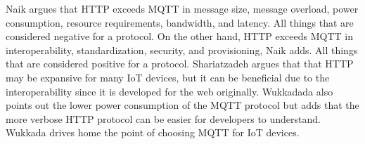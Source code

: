 Naik argues that HTTP exceeds MQTT in message size, message overload, power consumption, resource requirements, bandwidth, and latency. 
All things that are considered negative for a protocol.
On the other hand, HTTP exceeds MQTT in interoperability, standardization, security, and provisioning, Naik adds.\cite{Naik2017}
All things that are considered positive for a protocol.
Shariatzadeh argues that that HTTP may be expansive for many IoT devices, but it can be beneficial due to the interoperability since it is developed for the web originally.\cite{Shariatzadeh2016}
Wukkadada also points out the lower power consumption of the MQTT protocol but adds that the more verbose HTTP protocol can be easier for developers to understand.
Wukkada drives home the point of choosing MQTT for IoT devices.\cite{Wukkadada2018}